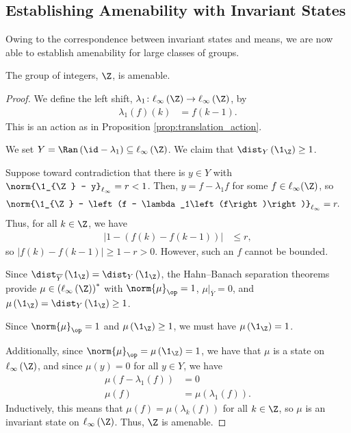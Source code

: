 \documentclass[10pt]{mypackage2}
\begin{document}
\subsection{Establishing Amenability with Invariant States}%
Owing to the correspondence between invariant states and means, we are now able to establish amenability for large classes of groups.
\begin{proposition}
  The group of integers, $\Z$, is amenable.
\end{proposition}
\begin{proof}
  We define the left shift, $\lambda_1\colon \ell_{\infty}\left(\Z\right) \rightarrow \ell_{\infty}\left(\Z\right)$, by
  \begin{align*}
    \lambda_1\left(f\right)\left(k\right) &= f\left(k-1\right).
  \end{align*}
  This is an action as in Proposition \ref{prop:translation_action}. \newline

  We set $Y = \Ran\left(\id - \lambda_1\right)\subseteq \ell_{\infty}\left(\Z\right)$. We claim that $\dist_{Y}\left(\1_{\Z}\right) \geq 1$.\newline

  Suppose toward contradiction that there is $y\in Y$ with $\norm{\1_{\Z} - y}_{\ell_{\infty}} = r < 1$. Then, $y = f - \lambda_1 f$ for some $f\in \ell_{\infty}(\Z)$, so
  \begin{align*}
    \norm{\1_{\Z} - \left(f - \lambda_1\left(f\right)\right)}_{\ell_{\infty}} &= r.
  \end{align*}
  Thus, for all $k\in\Z$, we have
  \begin{align*}
    \left\vert 1 - \left(f(k) - f(k-1)\right) \right\vert &\leq r,
  \end{align*}
  so $\left\vert f(k) - f\left(k-1\right) \right\vert \geq 1-r > 0$. However, such an $f$ cannot be bounded.\newline

  Since $\dist_{\overline{Y}}\left(\1_{\Z}\right) = \dist_{Y}\left(\1_{\Z}\right)$, the Hahn--Banach separation theorems provide $\mu\in \left(\ell_{\infty}\left(\Z\right)\right)^{\ast}$ with $\norm{\mu}_{\op} = 1$, $\mu|_{\overline{Y}} = 0$, and $\mu\left(\1_{\Z}\right) = \dist_{Y}\left(\1_{\Z}\right) \geq 1$.\newline

  Since $\norm{\mu}_{\op} = 1$ and $\mu\left(\1_{\Z}\right) \geq 1$, we must have $\mu\left(\1_{\Z}\right) = 1$.\newline

  Additionally, since $\norm{\mu}_{\op} = \mu\left(\1_{\Z}\right) = 1$, we have that $\mu$ is a state on $\ell_{\infty}\left(\Z\right)$, and since $\mu\left(y\right) = 0$ for all $y\in Y$, we have
  \begin{align*}
    \mu\left(f - \lambda_1\left(f\right)\right) &= 0\\
    \mu\left(f\right) &= \mu\left(\lambda_1\left(f\right)\right).
  \end{align*}
  Inductively, this means that $\mu\left(f\right) = \mu\left(\lambda_k\left(f\right)\right)$ for all $k\in \Z$, so $\mu$ is an invariant state on $\ell_{\infty}\left(\Z\right)$. Thus, $\Z$ is amenable.
\end{proof}
\end{document}
